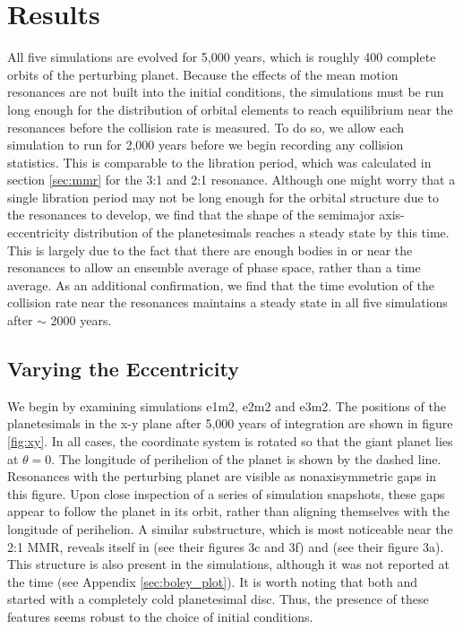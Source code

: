 \section{Results} \label{sec:results}

All five simulations are evolved for 5,000 years, which is roughly 400 complete orbits of the perturbing planet. Because the 
effects of the mean motion resonances are not built into the initial conditions, the simulations must be run long enough for the 
distribution of orbital elements to reach equilibrium near the resonances before the collision rate is measured. To do so, we allow 
each simulation to run for 2,000 years before we begin recording any collision statistics. This is comparable to the libration 
period, which was calculated in section \ref{sec:mmr} for the 3:1 and 2:1 resonance. Although one might worry that a single 
libration period may not be long enough for the orbital structure due to the resonances to develop, we find that the shape of the 
semimajor axis-eccentricity distribution of the planetesimals reaches a steady state by this time. This is largely due to the fact 
that there are enough bodies in or near the resonances to allow an ensemble average of phase space, rather than a time 
average. As an additional confirmation, we find that the time evolution of the collision rate near the resonances maintains a 
steady state in all five simulations after $\sim$ 2000 years.

\subsection{Varying the Eccentricity} \label{sec:vary_ecc}

We begin by examining simulations e1m2, e2m2 and e3m2. The positions of the planetesimals in the x-y plane after 5,000 years 
of integration are shown in figure \ref{fig:xy}. In all cases, the coordinate system is rotated so that the giant planet lies at $\theta 
= 0$. The longitude of perihelion of the planet is shown by the dashed line. Resonances with the perturbing planet are visible as 
nonaxisymmetric gaps in this figure. Upon close inspection of a series of simulation snapshots, these gaps appear to follow the 
planet in its orbit, rather than aligning themselves with the longitude of perihelion. A similar substructure, which is most 
noticeable near the 2:1 MMR, reveals itself in \cite{richardson00} (see their figures 3c and 3f) and \cite{tabeshian16} (see their 
figure 3a). This structure is also present in the \cite{boley17} simulations, although it was not reported at the time (see Appendix 
\ref{sec:boley_plot}). It is worth noting that both \cite{richardson00} and \cite{boley17} started with a completely cold 
planetesimal disc. Thus, the presence of these features seems robust to the choice of initial conditions.

